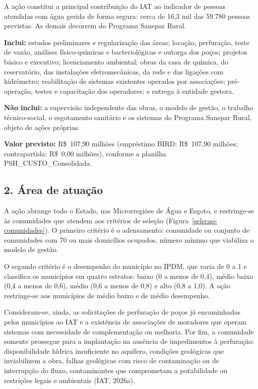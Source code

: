 A ação constitui a principal contribuição do IAT ao indicador de pessoas atendidas com água gerida de forma segura: cerca de 16,3 mil das 59.780 pessoas previstas. As demais decorrem do Programa Sanepar Rural.

\textbf{Inclui:} estudos preliminares e regularização das áreas; locação, perfuração, teste de vazão, análises físico-químicas e bacteriológicas e outorga dos poços; projetos básico e executivo; licenciamento ambiental; obras da casa de química, do reservatório, das instalações eletromecânicas, da rede e das ligações com hidrômetro; reabilitação de sistemas existentes operados por associações; pré-operação, testes e capacitação dos operadores; e entrega à entidade gestora.

\textbf{Não inclui:} a supervisão independente das obras, o modelo de gestão, o trabalho técnico-social, o esgotamento sanitário e os sistemas do Programa Sanepar Rural, objeto de ações próprias.

\textbf{Valor previsto:} R\$~107,90 milhões (empréstimo BIRD: R\$~107,90 milhões; contrapartida: R\$~0,00 milhões), conforme a planilha PSH\_CUSTO\_Consolidada.

{}
\subsection*{2. Área de atuação}

A ação abrange todo o Estado, nas Microrregiões de Água e Esgoto, e restringe-se às comunidades que atendem aos critérios de seleção (Figura~\ref{selecao-comunidades}). O primeiro critério é o adensamento: comunidade ou conjunto de comunidades com 70 ou mais domicílios ocupados, número mínimo que viabiliza o modelo de gestão.

O segundo critério é o desempenho do município no IPDM, que varia de 0 a 1 e classifica os municípios em quatro estratos: baixo (0 a menos de 0,4), médio baixo (0,4 a menos de 0,6), médio (0,6 a menos de 0,8) e alto (0,8 a 1,0). A ação restringe-se aos municípios de médio baixo e de médio desempenho.

Consideram-se, ainda, as solicitações de perfuração de poços já encaminhadas pelos municípios ao IAT e a existência de associações de moradores que operam sistemas com necessidade de complementação ou melhoria. Por fim, a comunidade somente prossegue para a implantação na ausência de impedimentos à perfuração: disponibilidade hídrica insuficiente no aquífero, condições geológicas que inviabilizem a obra, falhas geológicas com risco de contaminação ou de interrupção do fluxo, contaminantes que comprometam a potabilidade ou restrições legais e ambientais (IAT, 2026a).


